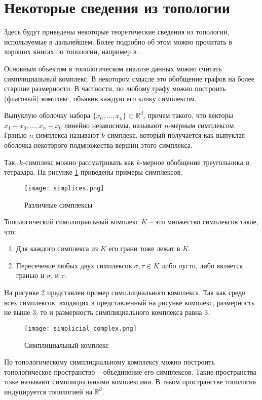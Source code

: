 \section{Некоторые сведения из топологии}
Здесь будут приведены некоторые теоретические сведения из топологии, используемые в дальнейшем. Более подробно об этом можно прочитать в хороших книгах по топологии, например в \cite{Viro, Vick, Hatcher}.%

Основным объектом в топологическом анализе данных можно считать симплициальный комплекс. В некотором смысле это обобщение графов на более старшие размерности. В частности, по любому графу можно построить (флаговый) комплекс, объявив каждую его клику симплексом.

Выпуклую оболочку набора $\{ x_0, ..., x_n \} \subset \mathbb{R}^d$, причем такого, что векторы $ x_1 - x_0, ..., x_n - x_0 $ линейно независимы, называют $n$-мерным симплексом. Гранью $n$-симплекса называют $k$-симплекс, который получается как выпуклая оболочка некоторого подмножества вершин этого симплекса.

Так, $k$-симплекс можно рассматривать как $k$-мерное обобщение треугольника и тетраэдра. На рисунке \ref{simplex} приведены примеры симплексов.
\begin{figure}[!htbp]
	\centering
	\texttt{[image: simplices.png]}
	\caption{Различные симплексы}
	\label{simplex}
\end{figure}
\begin{definition}
	Топологический симплициальный комплекс $K$ -- это множество симплексов такое, что:
	\begin{enumerate}
		\item Для каждого симплекса из $K$ его грани тоже лежат в $K$.
		\item Пересечение любых двух симплексов $\sigma, \tau \in K$ либо пусто, либо является гранью и $\sigma$, и $\tau$.
	\end{enumerate}
\end{definition}
На рисунке \ref{simplicial_complex} представлен пример симплициального комплекса. Так как среди всех симплексов, входящих в представленный на рисунке комплекс, размерность не выше $3$, то и размерность симплициального комплекса равна $3$.
\begin{figure}[!htbp]
	\centering
	\texttt{[image: simplicial\_complex.png]}
	\caption{Симплициальный комплекс}
	\label{simplicial_complex}
\end{figure}
По топологическому симплициальному комплексу можно построить топологическое пространство -- объединение его симплексов. Такие пространства тоже называют симплициальными комплексами. В таком пространстве топология индуцируется топологией на $\mathbb{R}^d$.

